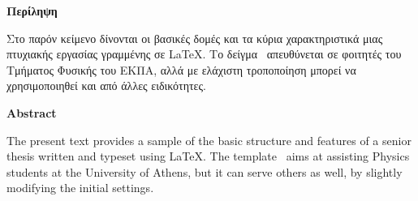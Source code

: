 \begin{center}
\large
{\bf Περίληψη}\\[5mm]
\end{center}
Στο παρόν κείμενο δίνονται οι βασικές δομές και τα κύρια χαρακτηριστικά
μιας πτυχιακής εργασίας γραμμένης σε \LaTeX. Το δείγμα~\cite{Mertzimekis2012}
απευθύνεται σε φοιτητές του Τμήματος Φυσικής του ΕΚΠΑ, αλλά με ελάχιστη
τροποποίηση μπορεί να χρησιμοποιηθεί και από άλλες ειδικότητες.

\vspace{50mm}

\begin{center}
\large
{\bf Abstract}\\[5mm]
\end{center}
The present text provides a sample of the basic structure and features of a senior
thesis written and typeset using \LaTeX. The template~\cite{Mertzimekis2012}
aims at assisting Physics students at the University of Athens, but it can serve
others as well, by slightly modifying the initial settings.
